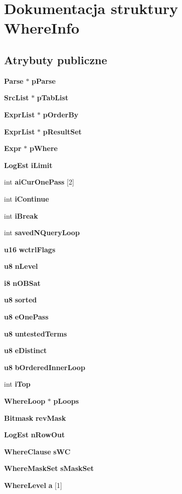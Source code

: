 \section{Dokumentacja struktury Where\+Info}
\label{struct_where_info}
\subsection*{Atrybuty publiczne}
\begin{DoxyCompactItemize}
\item 
\textbf{ Parse} $\ast$ \textbf{ p\+Parse}
\item 
\textbf{ Src\+List} $\ast$ \textbf{ p\+Tab\+List}
\item 
\textbf{ Expr\+List} $\ast$ \textbf{ p\+Order\+By}
\item 
\textbf{ Expr\+List} $\ast$ \textbf{ p\+Result\+Set}
\item 
\textbf{ Expr} $\ast$ \textbf{ p\+Where}
\item 
\textbf{ Log\+Est} \textbf{ i\+Limit}
\item 
int \textbf{ ai\+Cur\+One\+Pass} [2]
\item 
int \textbf{ i\+Continue}
\item 
int \textbf{ i\+Break}
\item 
int \textbf{ saved\+N\+Query\+Loop}
\item 
\textbf{ u16} \textbf{ wctrl\+Flags}
\item 
\textbf{ u8} \textbf{ n\+Level}
\item 
\textbf{ i8} \textbf{ n\+O\+B\+Sat}
\item 
\textbf{ u8} \textbf{ sorted}
\item 
\textbf{ u8} \textbf{ e\+One\+Pass}
\item 
\textbf{ u8} \textbf{ untested\+Terms}
\item 
\textbf{ u8} \textbf{ e\+Distinct}
\item 
\textbf{ u8} \textbf{ b\+Ordered\+Inner\+Loop}
\item 
int \textbf{ i\+Top}
\item 
\textbf{ Where\+Loop} $\ast$ \textbf{ p\+Loops}
\item 
\textbf{ Bitmask} \textbf{ rev\+Mask}
\item 
\textbf{ Log\+Est} \textbf{ n\+Row\+Out}
\item 
\textbf{ Where\+Clause} \textbf{ s\+WC}
\item 
\textbf{ Where\+Mask\+Set} \textbf{ s\+Mask\+Set}
\item 
\textbf{ Where\+Level} \textbf{ a} [1]
\end{DoxyCompactItemize}


